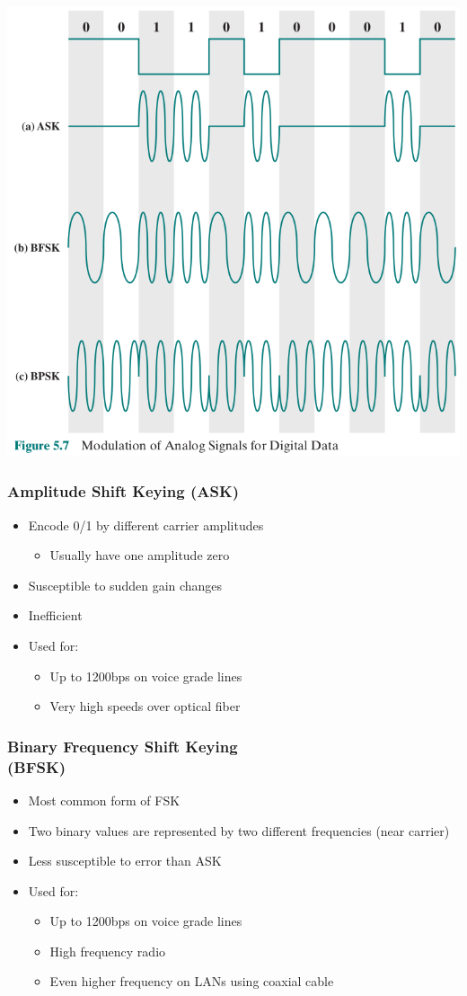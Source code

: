\documentclass[pdflatex,compress]{beamer}
\begin{document}
\begin{frame}
	\begin{center}
		\includegraphics[width=0.6\linewidth]{img/img11}
	\end{center}
\end{frame}

\begin{frame}
	\frametitle{Amplitude Shift Keying (ASK)}
	\begin{itemize}
		\item Encode 0/1 by different carrier amplitudes
		\begin{itemize}
			\item Usually have one amplitude zero
		\end{itemize}
		\item Susceptible to sudden gain changes
		\item Inefficient
		\item Used for:
		\begin{itemize}
			\item Up to 1200bps on voice grade lines
			\item Very high speeds over optical fiber
		\end{itemize}
	\end{itemize}
\end{frame}

\begin{frame}
	\frametitle{Binary Frequency Shift Keying\\(BFSK)}
	\begin{itemize}
		\item Most common form of FSK
		\item Two binary values are represented by two different frequencies (near carrier)
		\item Less susceptible to error than ASK\\
		\item Used for:
		\begin{itemize}
			\item Up to 1200bps on voice grade lines
			\item High frequency radio
			\item Even higher frequency on LANs using coaxial cable
		\end{itemize}
	\end{itemize}
\end{frame}
\end{document}
